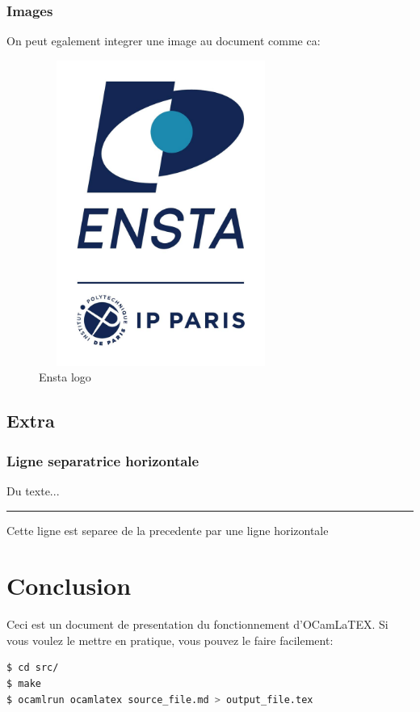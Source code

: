 \documentclass[11pt, a4paper]{article}
\begin{document}
\subsubsection{Images}

On peut egalement integrer une image au document comme ca: 
\begin{figure}[h]
\centering
\includegraphics[width=8cm,height=10cm,keepaspectratio]{logo.jpg}
\caption{Ensta logo}
\end{figure}

\subsection{Extra}

\subsubsection{Ligne separatrice horizontale}

Du texte...

\noindent\rule{\textwidth}{1pt}

Cette ligne est separee de la precedente par une ligne horizontale 

\section{Conclusion}

Ceci est un document de presentation du fonctionnement d'OCamLaTEX. Si vous voulez le mettre en pratique, vous pouvez le faire facilement:

\begin{lstlisting}[language=bash]
$ cd src/
$ make
$ ocamlrun ocamlatex source_file.md > output_file.tex
\end{lstlisting}
\end{document}
